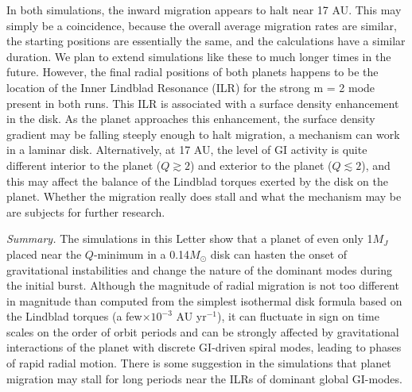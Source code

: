\documentclass[12pt,manuscript,authoryear]{aastex}
\begin{document}
In both simulations, the inward migration appears to halt near 17 AU. This may simply be a coincidence, because the overall average migration rates are similar, the starting positions are essentially the same, and the calculations have a similar duration. We plan to extend simulations like these to much longer times in the future. However, the final radial positions of both planets happens to be the location of the Inner Lindblad Resonance (ILR) for the strong m = 2 mode present in both runs. This ILR is associated with a surface density enhancement in the disk. 
As the planet approaches this enhancement, the surface density gradient may be falling steeply enough to halt migration, a mechanism can work in a laminar disk. 
Alternatively, at 17 AU, the level of GI activity is quite different interior to the planet ($Q \gtrsim 2$) and exterior to the planet ($Q \lesssim 2$), and this may affect the balance of the Lindblad torques exerted by the disk on the planet. Whether the migration really does stall and what the mechanism may be are subjects for further research.

{\it Summary.} The simulations in this Letter show that a planet of even only 1$M_J$ placed near the $Q$-minimum in a 0.14$M_{\odot}$ disk can hasten the onset of gravitational instabilities and change the nature of the dominant modes during the initial burst. Although the magnitude of radial migration is not too different in magnitude than computed from the simplest isothermal disk formula based on the Lindblad torques (a few$\times10^{-3}$ AU yr$^{-1}$), it can fluctuate in sign on time scales on the order of orbit periods and can be strongly affected by gravitational interactions of the planet with discrete GI-driven spiral modes, leading to phases of rapid radial motion. There is some suggestion in the simulations that planet migration may stall for long periods near the ILRs of dominant global GI-modes. 
\end{document}
